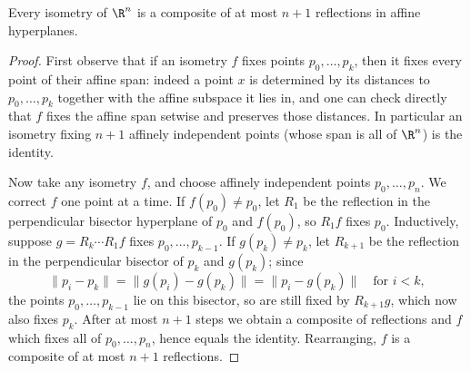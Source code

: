 \begin{theorem}
    Every isometry of $\R^n$ is a composite of at most $n + 1$ reflections in affine hyperplanes.
\end{theorem}
\begin{proof}
    First observe that if an isometry $f$ fixes points $p_0, \dots, p_k$, then it fixes every point of their affine span: indeed a point $x$ is determined by its distances to $p_0, \dots, p_k$ together with the affine subspace it lies in, and one can check directly that $f$ fixes the affine span setwise and preserves those distances. In particular an isometry fixing $n + 1$ affinely independent points (whose span is all of $\R^n$) is the identity.

    Now take any isometry $f$, and choose affinely independent points $p_0, \dots, p_n$. We correct $f$ one point at a time. If $f(p_0) \neq p_0$, let $R_1$ be the reflection in the perpendicular bisector hyperplane of $p_0$ and $f(p_0)$, so $R_1 f$ fixes $p_0$. Inductively, suppose $g = R_k \cdots R_1 f$ fixes $p_0, \dots, p_{k-1}$. If $g(p_k) \neq p_k$, let $R_{k+1}$ be the reflection in the perpendicular bisector of $p_k$ and $g(p_k)$; since
    $$
    \|p_i - p_k\| = \|g(p_i) - g(p_k)\| = \|p_i - g(p_k)\| \quad \text{for } i < k,
    $$
    the points $p_0, \dots, p_{k-1}$ lie on this bisector, so are still fixed by $R_{k+1} g$, which now also fixes $p_k$. After at most $n+1$ steps we obtain a composite of reflections and $f$ which fixes all of $p_0, \dots, p_n$, hence equals the identity. Rearranging, $f$ is a composite of at most $n + 1$ reflections.
\end{proof}

